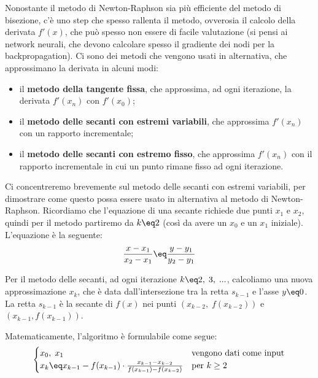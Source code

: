 Nonostante il metodo di Newton-Raphson sia più efficiente del metodo di bisezione, c'è uno step che spesso rallenta il metodo, ovverosia il calcolo della derivata $f'(x)$, che può spesso non essere di facile valutazione (si pensi ai network neurali, che devono calcolare spesso il gradiente dei nodi per la backpropagation). Ci sono dei metodi che vengono usati in alternativa, che approssimano la derivata in alcuni modi:
\begin{itemize}
    \item il \textbf{metodo della tangente fissa}, che approssima, ad ogni iterazione, la derivata $f'(x_n)$ con $f'(x_0)$;
    \item il \textbf{metodo delle secanti con estremi variabili}, che approssima $f'(x_n)$ con un rapporto incrementale;
    \item il \textbf{metodo delle secanti con estremo fisso}, che approssima $f'(x_n)$ con il rapporto incrementale in cui un punto rimane fisso ad ogni iterazione.
\end{itemize}

Ci concentreremo brevemente sul metodo delle secanti con estremi variabili, per dimostrare come questo possa essere usato in alternativa al metodo di Newton-Raphson. Ricordiamo che l'equazione di una secante richiede due punti $x_1$ e $x_2$, quindi per il metodo partiremo da $k \eq 2$ (così da avere un $x_0$ e un $x_1$ iniziale). L'equazione è la seguente:
\[ \frac{x - x_1}{x_2 - x_1} \eq \frac{y - y_1}{y_2 - y_1} \]

Per il metodo delle secanti, ad ogni iterazione $k \eq 2, \; 3, \; ...$, calcoliamo una nuova approssimazione $x_k$, che è data dall'intersezione tra la retta $s_{k - 1}$ e l'asse $y \eq 0$. La retta $s_{k - 1}$ è la secante di $f(x)$ nei punti $(x_{k - 2}, \; f(x_{k - 2}))$ e $(x_{k - 1}, f(x_{k - 1}))$.

Matematicamente, l'algoritmo è formulabile come segue:
\[ \begin{cases}
    x_0, \; x_1 & \text{vengono dati come input} \\
    x_k \eq x_{k - 1} - f(x_{k - 1}) \cdot \frac{x_{k - 1} - x_{k - 2}}{f(x_{k - 1}) - f(x_{k - 2})} & \text{per } k \geq 2
\end{cases} \]

